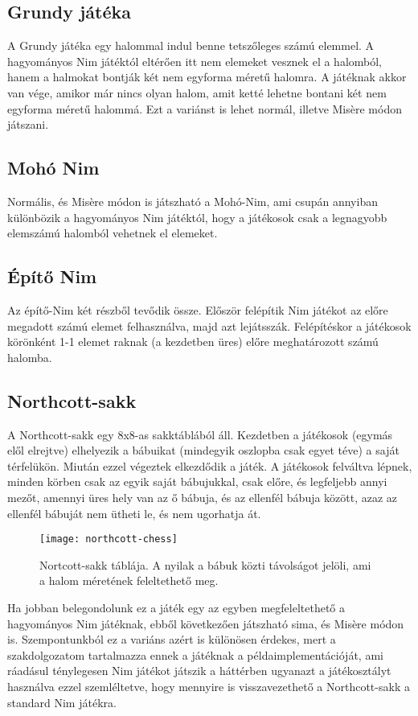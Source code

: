 \subsection{Grundy játéka}
A Grundy játéka egy halommal indul benne tetszőleges számú elemmel. A hagyományos Nim játéktól eltérően itt nem elemeket vesznek el a halomból, hanem a halmokat bontják két nem egyforma méretű halomra. A játéknak akkor van vége, amikor már nincs olyan halom, amit ketté lehetne bontani két nem egyforma méretű halommá. Ezt a variánst is lehet normál, illetve Misère módon játszani.

\subsection{Mohó Nim}
Normális, és Misère módon is játszható a Mohó-Nim, ami csupán annyiban különbözik a hagyományos Nim játéktól, hogy a játékosok csak a legnagyobb elemszámú halomból vehetnek el elemeket.

\subsection{Építő Nim}
Az építő-Nim két részből tevődik össze. Először felépítik Nim játékot az előre megadott számú elemet felhasználva, majd azt lejátsszák. Felépítéskor a játékosok körönként 1-1 elemet raknak (a kezdetben üres) előre meghatározott számú halomba.

\subsection{Northcott-sakk}
A Northcott-sakk egy 8x8-as sakktáblából áll. Kezdetben a játékosok (egymás elől elrejtve) elhelyezik a bábuikat (mindegyik oszlopba csak egyet téve) a saját térfelükön. Miután ezzel végeztek elkezdődik a játék. A játékosok felváltva lépnek, minden körben csak az egyik saját bábujukkal, csak előre, és legfeljebb annyi mezőt, amennyi üres hely van az ő bábuja, és az ellenfél bábuja között, azaz az ellenfél bábuját nem ütheti le, és nem ugorhatja át.\ujsor

\begin{figure}[h]
	\texttt{[image: northcott-chess]}
	\centering
	\caption{Nortcott-sakk táblája. A nyilak a bábuk közti távolságot jelöli, ami a halom méretének feleltethető meg.}
\end{figure}

Ha jobban belegondolunk ez a játék egy az egyben megfeleltethető a hagyományos Nim játéknak, ebből következően játszható sima, és Misère módon is.\ujsor 
Szempontunkból ez a variáns azért is különösen érdekes, mert a szakdolgozatom tartalmazza ennek a játéknak a példaimplementációját, ami ráadásul ténylegesen Nim játékot játszik a háttérben ugyanazt a játékosztályt használva ezzel szemléltetve, hogy mennyire is visszavezethető a Northcott-sakk a standard Nim játékra.

